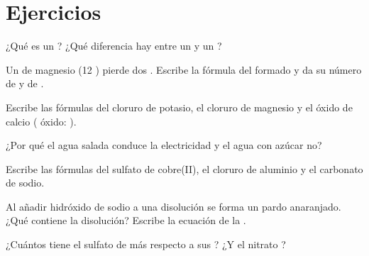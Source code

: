 \section{Ejercicios}

\begin{exercise}[$\star$]\label{exo:g9:ions:1}
¿Qué es un ? ¿Qué diferencia hay entre un  y un ?
\end{exercise}

\begin{exercise}[$\star$]\label{exo:g9:ions:2}
Un  de magnesio (12 ) pierde dos . Escribe la
fórmula del  formado y da su número de  y de .
\end{exercise}

\begin{exercise}[$\star$]\label{exo:g9:ions:3}
Escribe las fórmulas del cloruro de potasio, el cloruro de magnesio y el
óxido de calcio ( óxido: ).
\end{exercise}

\begin{exercise}[$\star$]\label{exo:g9:ions:4}
¿Por qué el agua salada conduce la electricidad y el agua con azúcar no?
\end{exercise}

\begin{exercise}[$\star\star$]\label{exo:g9:ions:5}
Escribe las fórmulas del sulfato de cobre(II), el cloruro de aluminio y
el carbonato de sodio.
\end{exercise}

\begin{exercise}[$\star\star$]\label{exo:g9:ions:6}
Al añadir hidróxido de sodio a una disolución se forma un 
pardo anaranjado. ¿Qué  contiene la disolución? Escribe la ecuación
de la .
\end{exercise}

\begin{exercise}[$\star\star$]\label{exo:g9:ions:7}
¿Cuántos  tiene el  sulfato  de más respecto a
sus ? ¿Y el  nitrato ?
\end{exercise}

